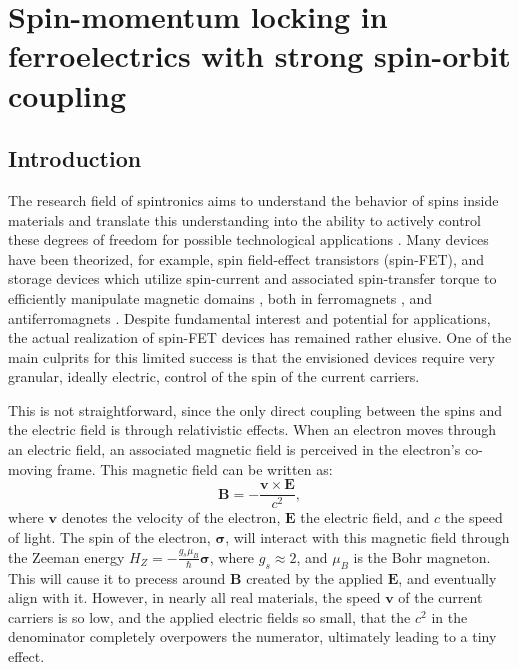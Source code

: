 \newcommand{\Unkr}{u_n(\bm{k}, \bm{r})}
\newcommand{\Eikr}{e^{i\bm{k}\cdot\bm{r}}}
\chapter{Spin-momentum locking in ferroelectrics with strong spin-orbit coupling\label{ch:Rashba}}
\section{Introduction}
The research field of spintronics aims to understand the behavior of spins inside materials and translate this understanding into the ability to actively control these degrees of freedom for possible technological applications \cite{Joshi2016}.
Many devices have been theorized, for example, spin field-effect transistors (spin-FET)\cite{Datta1990}, and storage devices  which utilize spin-current and associated spin-transfer torque to efficiently manipulate magnetic domains \cite{Kent2015}, both in ferromagnets \cite{Nunez2011}, and antiferromagnets \cite{Nunez2006TheorySemiconductors,Nunez2006TheoryMetals, Jungwirth2016}.
Despite fundamental interest and potential for applications, the actual realization of spin-FET devices has remained rather elusive.
One of the main culprits for this limited success is that the envisioned devices require very granular, ideally electric, control of the spin of the current carriers.

This is not straightforward, since the only direct coupling between the spins and the electric field is through relativistic effects. When an electron moves through an electric field, an associated magnetic field is perceived in the electron's co-moving frame. This magnetic field can be written as:
\begin{equation}
	\label{eq:Rashba_B}
	\bm{B} = - \frac{\bm v \times \bm E}{c^2},
\end{equation}
where $\bm v$ denotes the velocity of the electron, $\bm E$ the electric field, and $c$ the speed of light.
The spin of the electron, $\bm{\sigma}$, will interact with this magnetic field through the Zeeman energy $H_Z = -\frac{g_s\mu_B}{\hbar} \bm{\sigma}$, where $g_s \approx 2$, and $\mu_B$ is the Bohr magneton.
This will cause it to precess around $\bm B$ created by the applied $\bm E$, and eventually align with it.
However, in nearly all real materials, the speed $\bm v$ of the current carriers is so low, and the applied electric fields so small, that the $c^2$ in the denominator completely overpowers the numerator, ultimately leading to a tiny effect.

